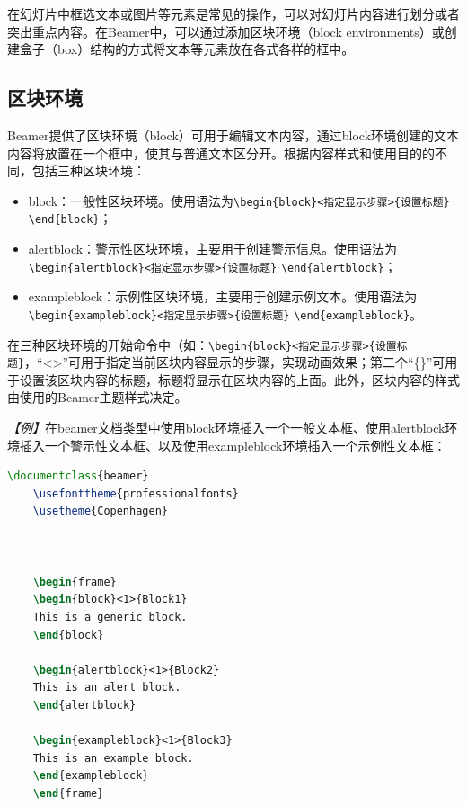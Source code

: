 在幻灯片中框选文本或图片等元素是常见的操作，可以对幻灯片内容进行划分或者突出重点内容。在Beamer中，可以通过添加区块环境（block environments）或创建盒子（box）结构的方式将文本等元素放在各式各样的框中。

\subsection{区块环境}

Beamer提供了区块环境（block）可用于编辑文本内容，通过block环境创建的文本内容将放置在一个框中，使其与普通文本区分开。根据内容样式和使用目的的不同，包括三种区块环境：
\begin{itemize}
    \item block：一般性区块环境。使用语法为\texttt{\textbackslash{}begin\{block\}<指定显示步骤>\{设置标题\}} \texttt{\textbackslash{}end\{block\}}；
    \item alertblock：警示性区块环境，主要用于创建警示信息。使用语法为\texttt{\textbackslash{}begin\{alertblock\}<指定显示步骤>\{设置标题\}}  \texttt{\textbackslash{}end\{alertblock\}}；
    \item exampleblock：示例性区块环境，主要用于创建示例文本。使用语法为\texttt{\textbackslash{}begin\{exampleblock\}<指定显示步骤>\{设置标题\}} \texttt{\textbackslash{}end\{exampleblock\}}。
\end{itemize}

在三种区块环境的开始命令中（如：\texttt{\textbackslash{}begin\{block\}<指定显示步骤>\{设置标题\}}，“<>”可用于指定当前区块内容显示的步骤，实现动画效果；第二个“\{\}”可用于设置该区块内容的标题，标题将显示在区块内容的上面。此外，区块内容的样式由使用的Beamer主题样式决定。

\emph{【例】}在beamer文档类型中使用block环境插入一个一般文本框、使用alertblock环境插入一个警示性文本框、以及使用exampleblock环境插入一个示例性文本框：
\begin{lstlisting}[language=TeX]
    \documentclass{beamer}
    \usefonttheme{professionalfonts}
    \usetheme{Copenhagen}

    

    \begin{frame}
    \begin{block}<1>{Block1}
    This is a generic block.
    \end{block}

    \begin{alertblock}<1>{Block2}
    This is an alert block.
    \end{alertblock}

    \begin{exampleblock}<1>{Block3}
    This is an example block.
    \end{exampleblock}
    \end{frame}

    
\end{lstlisting}


